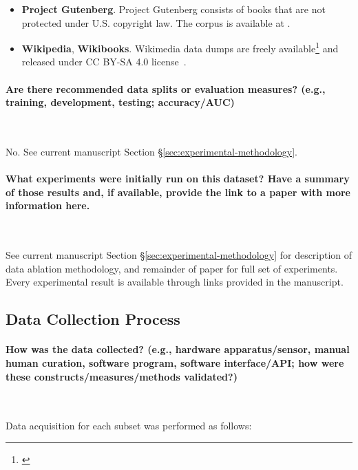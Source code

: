 \documentclass{article}
\begin{document}
\begin{itemize}[leftmargin=1em]
    \item \textbf{Project Gutenberg}. Project Gutenberg consists of books that are not protected under U.S. copyright law. The corpus is available at \href{https://www.gutenberg.org/}{}.
    \item \textbf{Wikipedia}, \textbf{Wikibooks}. Wikimedia data dumps are freely available\footnote{\label{foot:wiki}\href{https://dumps.wikimedia.org}{}} and released under CC BY-SA 4.0 license~\citep{cc-by-sa-4}.
\end{itemize}

\paragraph{Are there recommended data splits or evaluation measures? (e.g., training, development, testing; accuracy/AUC)}~

No. 
See current manuscript Section \S\ref{sec:experimental-methodology}.

\paragraph{What experiments were initially run on this dataset? Have a summary of those results and, if available, provide the link to a paper with more information here.}~

See current manuscript Section \S\ref{sec:experimental-methodology} for description of data ablation methodology, and remainder of paper for full set of experiments. 
Every experimental result is available through links provided in the manuscript.

\subsection{Data Collection Process}
\label{datasheet:collection}

\paragraph{How was the data collected? (e.g., hardware apparatus/sensor, manual human curation, software program, software interface/API; how were these constructs/measures/methods validated?)}~

Data acquisition for each subset was performed as follows:
\end{document}
